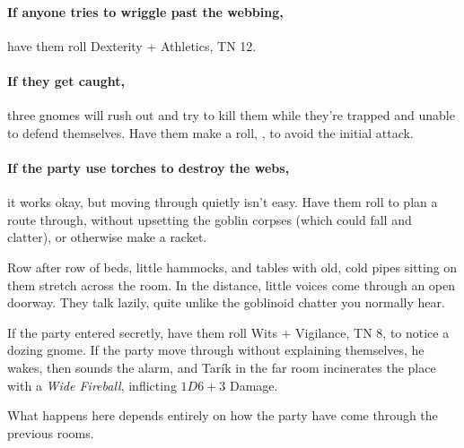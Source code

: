 \begin{multicols}{2}
\paragraph{If anyone tries to wriggle past the webbing,}
have them roll Dexterity + Athletics, TN 12.

\paragraph{If they get caught,}
three gnomes will rush out and try to kill them while they're trapped and unable to defend themselves.
Have them make a  roll, \tn[8], to avoid the initial attack.

\paragraph{If the party use torches to destroy the webs,}
it works okay, but moving through quietly isn't easy.
Have them roll  to plan a route through, without upsetting the goblin corpses (which could fall and clatter), or otherwise make a racket.


\begin{boxtext}

  Row after row of beds, little hammocks, and tables with old, cold pipes sitting on them stretch across the room.
  In the distance, little voices come through an open doorway.
  They talk lazily, quite unlike the goblinoid chatter you normally hear.

\end{boxtext}


If the party entered secretly, have them roll Wits + Vigilance, TN 8, to notice a dozing gnome.
If the party move through without explaining themselves, he wakes, then sounds the alarm, and Tar\'ik in the far room incinerates the place with a \textit{Wide Fireball}, inflicting $1D6+3$ Damage.


What happens here depends entirely on how the party have come through the previous rooms.


\end{multicols}
